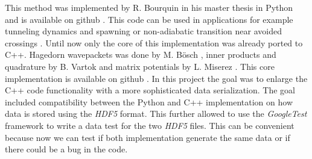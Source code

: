 This method was implemented by R. Bourquin in his master thesis \cite{B_master_thesis} in Python and is available on github \cite{waveblocksnd}. This code can be used in applications for example tunneling dynamics and spawning \cite{GHJ_tunneling_spawning} or non-adiabatic transition near avoided crossings \cite{BGH_natac}. Until now only the core of this implementation was already ported to C++. Hagedorn wavepackets was done by M. B\"osch \cite{bt_michajab}, inner products and quadrature by B. Vartok \cite{st_benedekv} and matrix potentials by L. Miserez \cite{bt_lionelm}. This core implementation is available on github \cite{libwaveblocks}. In this project the goal was to enlarge the C++ code functionality with a more sophisticated data serialization. The goal included compatibility between the Python and C++ implementation on how data is stored using the \textit{HDF5} format. This further allowed to use the \textit{GoogleTest} framework to write a data test for the two \textit{HDF5} files. This can be convenient because now we can test if both implementation generate the same data or if there could be a bug in the code.